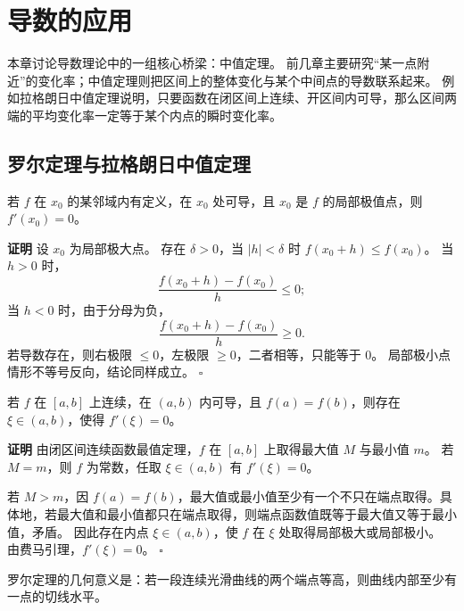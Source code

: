 \documentclass[fontset=fandol]{ctexart}
\newenvironment{proofdetail}{\par\noindent\textbf{证明}\quad}{\hfill$\square$\par\vspace{0.8em}}
\begin{document}
\fi

\clearpage
\section{导数的应用}

本章讨论导数理论中的一组核心桥梁：中值定理。 前几章主要研究“某一点附近”的变化率；中值定理则把区间上的整体变化与某个中间点的导数联系起来。 例如拉格朗日中值定理说明，只要函数在闭区间上连续、开区间内可导，那么区间两端的平均变化率一定等于某个内点的瞬时变化率。




\subsection{罗尔定理与拉格朗日中值定理}

\begin{theorem}[费马（Fermat）引理]
若 $f$ 在 $x_0$ 的某邻域内有定义，在 $x_0$ 处可导，且 $x_0$ 是 $f$ 的局部极值点，则 $f'(x_0)=0$。
\end{theorem}
\begin{proofdetail}
设 $x_0$ 为局部极大点。 存在 $\delta>0$，当 $|h|<\delta$ 时 $f(x_0+h)\leq f(x_0)$。 当 $h>0$ 时，
\[
\frac{f(x_0+h)-f(x_0)}{h}\leq0;
\]
当 $h<0$ 时，由于分母为负，
\[
\frac{f(x_0+h)-f(x_0)}{h}\geq0.
\]
若导数存在，则右极限 $\leq0$，左极限 $\geq0$，二者相等，只能等于 $0$。 局部极小点情形不等号反向，结论同样成立。
\end{proofdetail}

\begin{theorem}[罗尔定理]
若 $f$ 在 $[a,b]$ 上连续，在 $(a,b)$ 内可导，且 $f(a)=f(b)$，则存在 $\xi\in(a,b)$，使得 $f'(\xi)=0$。
\end{theorem}
\begin{proofdetail}
由闭区间连续函数最值定理，$f$ 在 $[a,b]$ 上取得最大值 $M$ 与最小值 $m$。 若 $M=m$，则 $f$ 为常数，任取 $\xi\in(a,b)$ 有 $f'(\xi)=0$。

若 $M>m$，因 $f(a)=f(b)$，最大值或最小值至少有一个不只在端点取得。具体地，若最大值和最小值都只在端点取得，则端点函数值既等于最大值又等于最小值，矛盾。 因此存在内点 $\xi\in(a,b)$，使 $f$ 在 $\xi$ 处取得局部极大或局部极小。 由费马引理，$f'(\xi)=0$。
\end{proofdetail}

罗尔定理的几何意义是：若一段连续光滑曲线的两个端点等高，则曲线内部至少有一点的切线水平。

\begin{center}
\end{center}
\end{document}
